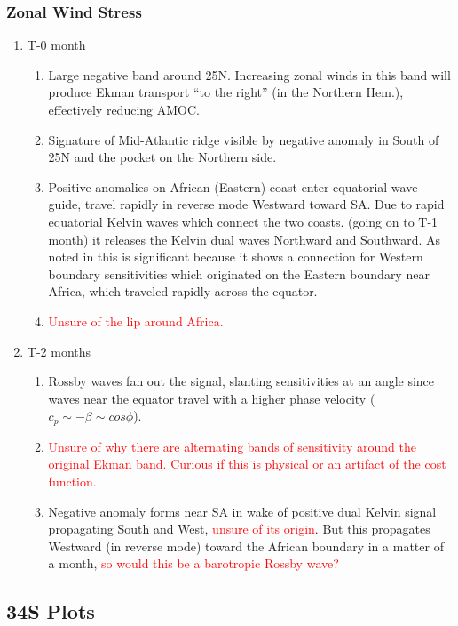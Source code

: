 \documentclass[a4paper,11pt]{article}
\newcommand{\red}[1]{\textcolor{red}{#1}}
\begin{document}
    \subsubsection{Zonal Wind Stress}
    \begin{enumerate}
	\item T-0 month 
	 \begin{enumerate}
	   \item Large negative band around 25N. Increasing zonal winds in this band will produce Ekman transport ``to the right'' (in the Northern Hem.), effectively reducing AMOC. 
	   \item Signature of Mid-Atlantic ridge visible by negative anomaly in South of 25N and the pocket on the Northern side.
	   \item Positive anomalies on African (Eastern) coast enter equatorial wave guide, travel rapidly in reverse mode Westward toward SA. Due to rapid equatorial Kelvin waves which connect the two coasts. (going on to T-1 month) it releases the Kelvin dual waves Northward and Southward. As noted in \cite{heimbach_timescales} this is significant because it shows a connection for Western boundary sensitivities which originated on the Eastern boundary near Africa, which traveled rapidly across the equator.
	   \item \red{Unsure of the lip around Africa.}
	 \end{enumerate}
	\item T-2 months
	 \begin{enumerate}
	   \item Rossby waves fan out the signal, slanting sensitivities at an angle since waves near the equator travel with a higher phase velocity ($c_p \sim -\beta \sim cos\phi$). 
	   \item \red{Unsure of why there are alternating bands of sensitivity around the original Ekman band. Curious if this is physical or an artifact of the cost function.} 
	   \item Negative anomaly forms near SA in wake of positive dual Kelvin signal propagating South and West, \red{unsure of its origin}. But this propagates Westward (in reverse mode) toward the African boundary in a matter of a month, \red{so would this be a barotropic Rossby wave?}  
	 \end{enumerate}
    \end{enumerate}

   \subsection{34S Plots}
\end{document}
